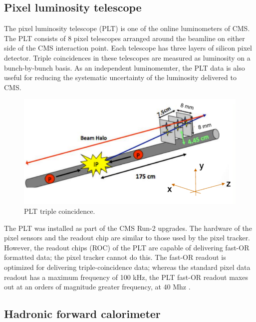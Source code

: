 \subsection{Pixel luminosity telescope}

The pixel luminosity telescope (PLT) is one of the online luminometers of CMS. The PLT consists of 8 pixel telescopes arranged around the beamline on either side of the CMS interaction point. Each telescope has three layers of silicon pixel detector. Triple coincidences in these telescopes are measured as luminosity on a bunch-by-bunch basis. As an independent luminomemter, the PLT data is also useful for reducing the systematic uncertainty of the luminosity delivered to CMS. 

\begin{figure}[]
\begin{centering}
\includegraphics[width=5in]{Chapter4/importfigs/plt_triple.png}
\par\end{centering}
\caption{PLT triple coincidence. \label{fig:pltTriple}}
\end{figure}

The PLT was installed as part of the CMS Run-2 upgrades. The hardware of the pixel sensors and the readout chip are similar to those used by the pixel tracker. However, the readout chips (ROC) of the PLT are capable of delivering fast-OR formatted data; the pixel tracker cannot do this. The fast-OR readout is optimized for delivering triple-coincidence data; whereas the standard pixel data readout has a maximum frequency of 100 kHz, the PLT fast-OR readout maxes out at an orders of magnitude greater frequency, at 40 Mhz \cite{Kornmayer:2016wkz}.

\subsection{Hadronic forward calorimeter}

